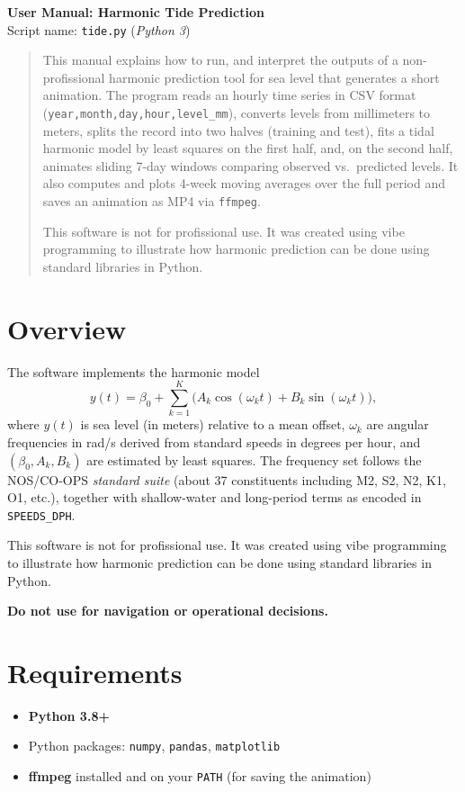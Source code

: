 \documentclass[11pt,a4paper]{article}
\begin{document}
\begin{center}
{\LARGE \textbf{User Manual: Harmonic Tide Prediction}}\\[0.5em]
\large Script name: \texttt{tide.py} \quad(\textit{Python 3})\\[0.25em]
\end{center}

\begin{abstract}
This manual explains how to run, and interpret the outputs of a non-profissional harmonic prediction tool for sea level that generates a short animation.  The program reads an hourly time series in CSV format (\texttt{year,month,day,hour,level\_mm}), converts levels from millimeters to meters, splits the record into two halves (training and test), fits a tidal harmonic model by least squares on the first half, and, on the second half, animates sliding 7-day windows comparing observed vs.\ predicted levels. It also computes and plots 4-week moving averages over the full period and saves an animation as MP4 via \texttt{ffmpeg}.

This software is not for profissional use. It was created using vibe programming to illustrate  how harmonic prediction can be done using  standard libraries in Python. 
\end{abstract}

\tableofcontents

\section{Overview}
The software implements the harmonic model
\[
y(t)=\beta_0+\sum_{k=1}^{K}\bigl(A_k\cos(\omega_k t)+B_k\sin(\omega_k t)\bigr),
\]
where $y(t)$ is sea level (in meters) relative to a mean offset, $\omega_k$ are angular frequencies in rad/s derived from standard speeds in degrees per hour, and $(\beta_0,A_k,B_k)$ are estimated by least squares. The frequency set follows the NOS/CO-OPS \emph{standard suite} (about 37 constituents including M2, S2, N2, K1, O1, etc.), together with shallow-water and long-period terms as encoded in \texttt{SPEEDS\_DPH}.

This software is not for profissional use. It was created using vibe programming to illustrate  how harmonic prediction can be done using  standard libraries in Python. 

{\bf Do not use for navigation or operational decisions.}

\section{Requirements}
\begin{itemize}[leftmargin=1.5em]
  \item \textbf{Python 3.8+}
  \item Python packages: \texttt{numpy}, \texttt{pandas}, \texttt{matplotlib}
  \item \textbf{ffmpeg} installed and on your \texttt{PATH} (for saving the animation)
\end{itemize}
\end{document}
